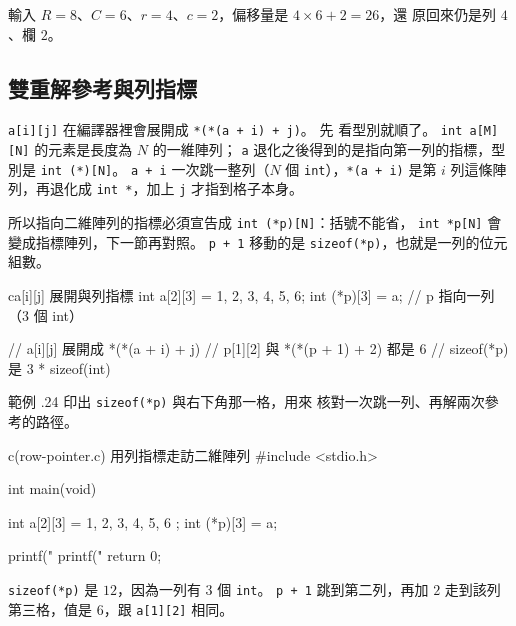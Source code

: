
輸入 $R=8$、$C=6$、$r=4$、$c=2$，偏移量是 $4 \times 6 + 2 = 26$，還
原回來仍是列 $4$、欄 $2$。

\subsection{雙重解參考與列指標}

\texttt{a[i][j]} 在編譯器裡會展開成 \texttt{*(*(a + i) + j)}。 先
看型別就順了。 \texttt{int a[M][N]} 的元素是長度為 $N$ 的一維陣列；
\texttt{a} 退化之後得到的是指向第一列的指標，型別是
\texttt{int (*)[N]}。 \texttt{a + i} 一次跳一整列（$N$ 個
\texttt{int}），\texttt{*(a + i)} 是第 $i$ 列這條陣列，再退化成
\texttt{int *}，加上 \texttt{j} 才指到格子本身。

所以指向二維陣列的指標必須宣告成 \texttt{int (*p)[N]}：括號不能省，
\texttt{int *p[N]} 會變成指標陣列，下一節再對照。 \texttt{p + 1}
移動的是 \texttt{sizeof(*p)}，也就是一列的位元組數。

\begin{code}{c}{a[i][j] 展開與列指標}
int a[2][3] = {{1, 2, 3}, {4, 5, 6}};
int (*p)[3] = a;          // p 指向一列（3 個 int）

// a[i][j]  展開成  *(*(a + i) + j)
// p[1][2]  與      *(*(p + 1) + 2)  都是 6
// sizeof(*p) 是 3 * sizeof(int)
\end{code}

範例 \thechapter.24 印出 \texttt{sizeof(*p)} 與右下角那一格，用來
核對一次跳一列、再解兩次參考的路徑。

\begin{example}{c}{(row-pointer.c) 用列指標走訪二維陣列}
#include <stdio.h>

int main(void) {
    int a[2][3] = {
        {1, 2, 3},
        {4, 5, 6}
    };
    int (*p)[3] = a;

    printf("%
    printf("%
    return 0;
}
\end{example}


\texttt{sizeof(*p)} 是 $12$，因為一列有 $3$ 個 \texttt{int}。
\texttt{p + 1} 跳到第二列，再加 $2$ 走到該列第三格，值是 $6$，跟
\texttt{a[1][2]} 相同。


